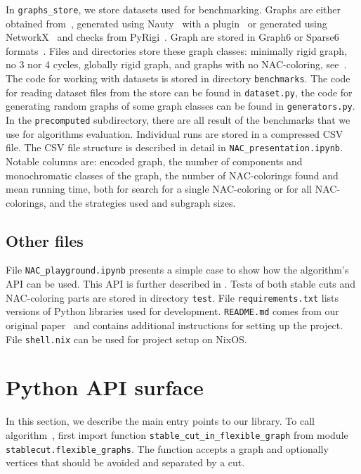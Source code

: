 In \texttt{graphs\_store}, we store datasets used for benchmarking.
Graphs are either obtained from~\cite{extremal_graphs},
generated using Nauty~\cite{nauty} with a plugin~\cite{nauty_plugin}
or generated using NetworkX~\cite{networkx} and checks from PyRigi~\cite{pyrigi}.
Graph are stored in Graph6 or Sparse6 formats~\cite{graph6}.
%
Files and directories store these graph classes:
minimally rigid graph, no 3 nor 4 cycles, globally rigid graph,
and graphs with no NAC-coloring, see~.
%
The code for working with datasets is stored in directory \texttt{benchmarks}.
The code for reading dataset files from the store can be found in \texttt{dataset.py},
the code for generating random graphs of some graph classes
can be found in \texttt{generators.py}.
%
In the \texttt{precomputed} subdirectory, there are all result of the benchmarks that
we use for algorithms evaluation.
Individual runs are stored in a compressed CSV file.
The CSV file structure is described in detail in \texttt{NAC\_presentation.ipynb}.
Notable columns are:
encoded graph,
the number of \trcon{} components and monochromatic classes of the graph,
the number of NAC-colorings found and mean running time,
both for search for a single NAC-coloring or for all NAC-colorings,
and the strategies used and subgraph sizes.


\subsection{Other files}

File \texttt{NAC\_playground.ipynb} presents a simple case
to show how the algorithm's API can be used.
This API is further described in .
%
Tests of both stable cuts and NAC-coloring parts are stored in directory \texttt{test}.
%
File \texttt{requirements.txt} lists versions of Python libraries used for development.
\texttt{README.md} comes from our original paper~\cite{my_paper}
and contains additional instructions for setting up the project.
File \texttt{shell.nix} can be used for project setup on NixOS\@.


\section{Python API surface}%
\label{sec:impl_python_api}

In this section,
we describe the main entry points to our library.
%
To call algorithm~,
first import function \texttt{stable\_cut\_in\_flexible\_graph}
from module \texttt{stablecut.flexible\_graphs}.
The function accepts a graph and
optionally vertices that should be avoided and separated by a cut.

